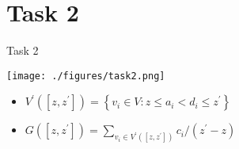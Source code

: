 
\section{Task 2}

\setcounter{task}{1}

\begin{frame}[allowframebreaks]{Task 2}{}
  \begin{tasknoinc}
    \centering
    \texttt{[image: ./figures/task2.png]}
  \end{tasknoinc}
  \begin{requirements}
    \begin{itemize}
      \item $V^{\prime}\left(\left[z, z^{\prime}\right]\right)=\left\{v_i \in V: z \leq a_i<d_i \leq z^{\prime}\right\}$
      \item $G\left(\left[z, z^{\prime}\right]\right)=\sum_{v_i \in V^{\prime}\left(\left[z, z^{\prime}\right]\right)} c_i /\left(z^{\prime}-z\right)$
    \end{itemize}
  \end{requirements}
\end{frame}

